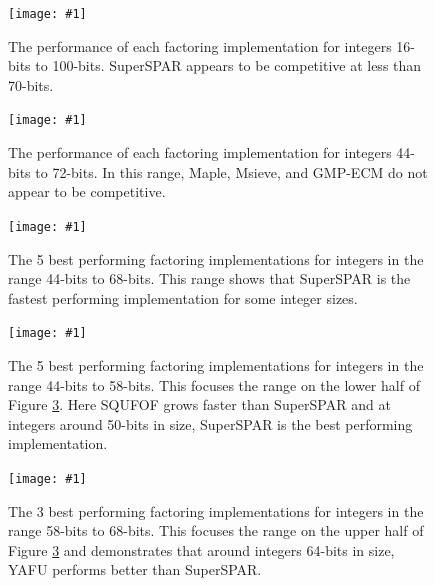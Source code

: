 \documentclass{ucalgthes1}
\theoremstyle{definition}
\newcommand{\mygraphX}[4]{
	\begin{figure}[htb]
	\centering
	\texttt{[image: \#1]}
	\caption[#4]{#3}
	\label{#2}
	\end{figure}
}
\begin{document}
\mygraphX{factoring-all.eps}{fig:factoring1}{The performance of each factoring implementation for integers 16-bits to 100-bits.  SuperSPAR appears to be competitive at less than 70-bits.}{Factoring performance for 16-bits to 100-bits.}
\mygraphX{factoring-all-44-72.eps}{fig:factoring2}{The performance of each factoring implementation for integers 44-bits to 72-bits.  In this range, Maple, Msieve, and GMP-ECM do not appear to be competitive.}{Factoring performance for 44-bits to 72-bits.}
\mygraphX{factoring-small-44-68.eps}{fig:factoring3}{The 5 best performing factoring implementations for integers in the range 44-bits to 68-bits.  This range shows that SuperSPAR is the fastest performing implementation for some integer sizes.}{Best factoring implementations for 44-bits to 68-bits.}
\mygraphX{factoring-small-44-58.eps}{fig:factoring4}{The 5 best performing factoring implementations for integers in the range 44-bits to 58-bits.  This focuses the range on the lower half of Figure \ref{fig:factoring3}.  Here SQUFOF grows faster than SuperSPAR and at integers around 50-bits in size, SuperSPAR is the best performing implementation.}{Best factoring implementations for 44-bits to 58-bits.}
\mygraphX{factoring-small-58-68.eps}{fig:factoring5}{The 3 best performing factoring implementations for integers in the range 58-bits to 68-bits.  This focuses the range on the upper half of Figure \ref{fig:factoring3} and demonstrates that around integers 64-bits in size, YAFU performs better than SuperSPAR.}{Best factoring implementations for 58-bits to 68-bits.}
\end{document}
